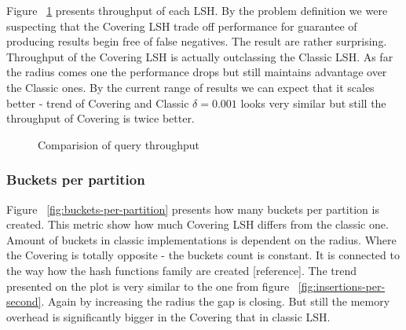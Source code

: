 Figure ~\ref{fig:queries-per-second} presents throughput of each LSH. By the problem definition we were suspecting that the Covering LSH trade off performance for guarantee of producing results begin free of false negatives. The result are rather surprising. Throughput of the Covering LSH is actually outclassing the Classic LSH. As far the radius comes one the performance drops but still maintains advantage over the Classic ones. By the current range of results we can expect that it scales better - trend of Covering and Classic $\delta = 0.001$ looks very similar but still the throughput of Covering is twice better.

\begin{figure}[ht]

  \caption{Comparision of query throughput}
  \label{fig:queries-per-second}
\end{figure}

\subsubsection{Buckets per partition}

Figure ~\ref{fig:buckets-per-partition} presents how many buckets per partition is created. This metric show how much Covering LSH differs from the classic one. Amount of buckets in classic implementations is dependent on the radius. Where the Covering is totally opposite - the buckets count is constant. It is connected to the way how the hash functions family are created [reference]. The trend presented on the plot is very similar to the one from figure ~\ref{fig:insertions-per-second}. Again by increasing the radius the gap is closing. But still the memory overhead is significantly bigger in the Covering that in classic LSH.

